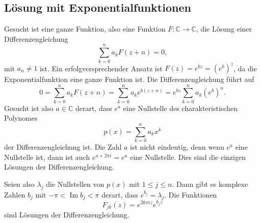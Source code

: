 %
%
\subsection{Lösung mit Exponentialfunktionen}
Gesucht ist eine ganze Funktion, also eine Funktion
$F\colon\mathbb{C}\to\mathbb{C}$, die Lösung einer
Differenzengleichung
%
\begin{equation}
\sum_{k=0}^n a_kF(z+n)=0,
\end{equation}
mit $a_n\ne 1$ ist.
Ein erfolgversprechender Ansatz ist $F(z)=e^{bz}=(e^b)^z$, da die
Exponentialfunktion eine ganze Funktion ist.
Die Differenzengleichung führt auf
\[
0
=
\sum_{k=0}^n
a_kF(z+n)
=
\sum_{k=0}^n
a_k e^{b(z+n)}
=
e^{bz}
\sum_{k=0}^n
a_k (e^b)^n.
\]
Gesucht ist also $a\in\mathbb{C}$ derart, dass $e^a$ eine Nullstelle
des charakteristischen Polynomes
%
%
\[
p(x) = \sum_{k=0}^n a_kx^k
\]
der Differenzengleichung ist.
Die Zahl $a$ ist nicht eindeutig, denn wenn $e^a$ eine Nullstelle ist,
dann ist auch $e^{a+2\pi i}=e^a$ eine Nullstelle.
Dies sind die einzigen Lösungen der Differenzengleichung.

Seien also $\lambda_j$ die Nullstellen von $p(x)$ mit $1\le j\le n$.
Dann gibt es komplexe Zahlen $b_j$ 
mit $-\pi < \operatorname{Im}b_j < \pi$ derart, dass $e^{b_j}=\lambda_j$.
Die Funktionen
\[
F_{jk}(z) = e^{2k\pi i z} e^{b_jz}
\]
sind Lösungen der Differenzengleichung.

%
%
